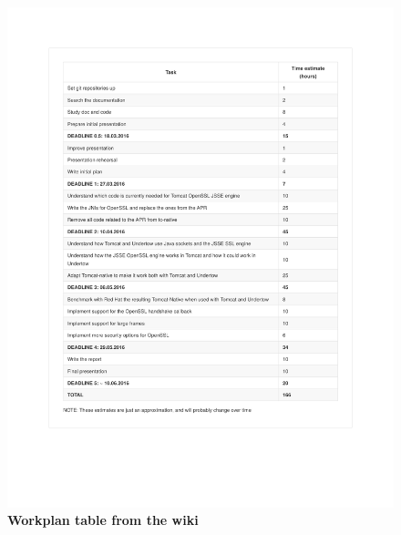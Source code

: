 \documentclass[11pt,a4paper,bibliography=totocnumbered]{scrartcl}
\begin{document}
\begin{figure}[h!]
\begin{center}
\includegraphics[trim=400 0 400 0,scale=0.9]{workplan}
\end{center}
\caption{\textbf{Workplan table from the wiki}}
\label{fig:workplan}
\end{figure}

\FloatBarrier
\end{document}
